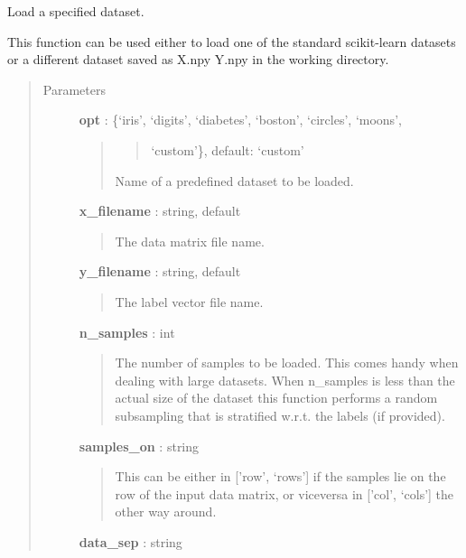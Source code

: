 \documentclass[letterpaper,10pt,english]{sphinxmanual}
\begin{document}
\begin{fulllineitems}
\label{index:adenine.utils.data_source.load}
Load a specified dataset.

This function can be used either to load one of the standard scikit-learn
datasets or a different dataset saved as X.npy Y.npy in the working
directory.
\begin{quote}\begin{description}
\item[{Parameters}] \leavevmode
\textbf{opt} : \{`iris', `digits', `diabetes', `boston', `circles', `moons',
\begin{quote}
\begin{quote}

`custom'\}, default: `custom'
\end{quote}

Name of a predefined dataset to be loaded.
\end{quote}

\textbf{x\_filename} : string, default
\begin{quote}

The data matrix file name.
\end{quote}

\textbf{y\_filename} : string, default
\begin{quote}

The label vector file name.
\end{quote}

\textbf{n\_samples} : int
\begin{quote}

The number of samples to be loaded. This comes handy when dealing with
large datasets. When n\_samples is less than the actual size of the
dataset this function performs a random subsampling that is stratified
w.r.t. the labels (if provided).
\end{quote}

\textbf{samples\_on} : string
\begin{quote}

This can be either in {[}'row', `rows'{]} if the samples lie on the row of
the input data matrix, or viceversa in {[}'col', `cols'{]} the other way
around.
\end{quote}

\textbf{data\_sep} : string
\begin{quote}


\end{quote}
\end{description}
\end{quote}
\end{fulllineitems}
\end{document}
